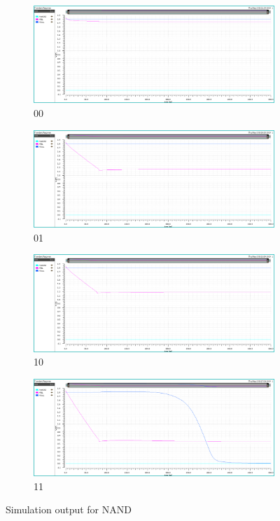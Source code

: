 \begin{figure}[H]
\begin{center}
\begin{subfigure}{0.4\textwidth}
\includegraphics[width=\textwidth]{nand00.png}
\caption{00}
\end{subfigure}
\begin{subfigure}{0.4\textwidth}
\includegraphics[width=\textwidth]{nand01.png}
\caption{01}
\end{subfigure}
\begin{subfigure}{0.4\textwidth}
\includegraphics[width=\textwidth]{NAND10.png}
\caption{10}
\end{subfigure}
\begin{subfigure}{0.4\textwidth}
\includegraphics[width=\textwidth]{nand11.png}
\caption{11}
\end{subfigure}
\end{center}
\caption{Simulation output for NAND }

\end{figure}

